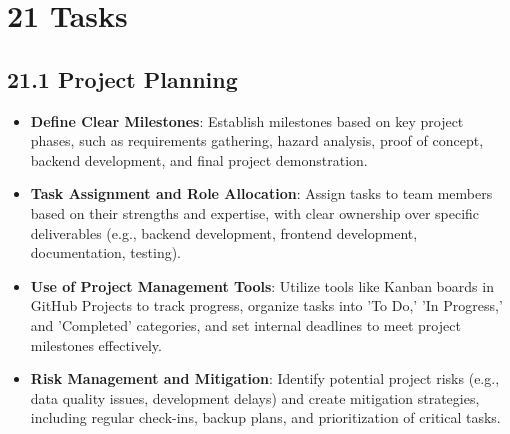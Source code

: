 \documentclass[12pt]{article}
\begin{document}
\section*{21 Tasks}

\subsection*{21.1 Project Planning}
\begin{itemize}[leftmargin=2cm]
    \item \textbf{Define Clear Milestones}: Establish milestones based on key project phases, such as requirements gathering, hazard analysis, proof of concept, backend development, and final project demonstration.
    \item \textbf{Task Assignment and Role Allocation}: Assign tasks to team members based on their strengths and expertise, with clear ownership over specific deliverables (e.g., backend development, frontend development, documentation, testing).
    \item \textbf{Use of Project Management Tools}: Utilize tools like Kanban boards in GitHub Projects to track progress, organize tasks into 'To Do,' 'In Progress,' and 'Completed' categories, and set internal deadlines to meet project milestones effectively.
    \item \textbf{Risk Management and Mitigation}: Identify potential project risks (e.g., data quality issues, development delays) and create mitigation strategies, including regular check-ins, backup plans, and prioritization of critical tasks.
\end{itemize}
\end{document}
